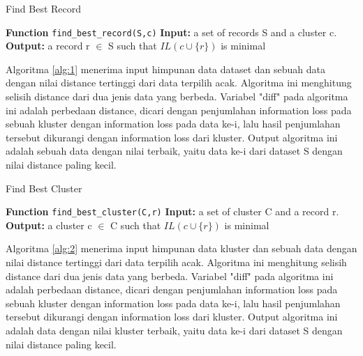 \begin{algorithm}[H]
  \caption{Find Best Record}\label{alg:1}
  \begin{algorithmic}[1]
  \State \textbf{Function} \texttt{find\_best\_record(S,c)}
  \State \textbf{Input:} a set of records S and a cluster c.
  \State \textbf{Output:} a record r $\in$ S such that $IL(c \cup \{r\})$ is minimal
  \\
  \EndIf
  \EndFor
  \end{algorithmic}
\end{algorithm}
Algoritma \ref{alg:1} menerima input himpunan data  dataset dan sebuah data dengan nilai distance tertinggi dari data terpilih acak. Algoritma ini menghitung selisih distance dari dua jenis data yang berbeda. Variabel "diff" pada algoritma ini adalah perbedaan distance, dicari dengan penjumlahan information loss pada sebuah kluster dengan information loss pada data ke-i, lalu hasil penjumlahan tersebut dikurangi dengan information loss dari kluster. Output algoritma ini adalah sebuah data dengan nilai terbaik, yaitu data ke-i dari dataset S dengan nilai distance paling kecil.
\begin{algorithm}[H]
  \caption{Find Best Cluster}\label{alg:2}
  \begin{algorithmic}[1]
  \State \textbf{Function} \texttt{find\_best\_cluster(C,r)}
  \State \textbf{Input:} a set of cluster C and a record r.
  \State \textbf{Output:} a cluster c $\in$ C such that $IL(c \cup \{r\})$ is minimal
  \\
  \EndIf
  \EndFor
  \end{algorithmic}
\end{algorithm}

Algoritma \ref{alg:2} menerima input himpunan data  kluster dan sebuah data dengan nilai distance tertinggi dari data terpilih acak. Algoritma ini menghitung selisih distance dari dua jenis data yang berbeda. Variabel "diff" pada algoritma ini adalah perbedaan distance, dicari dengan penjumlahan information loss pada sebuah kluster dengan information loss pada data ke-i, lalu hasil penjumlahan tersebut dikurangi dengan information loss dari kluster. Output algoritma ini adalah data dengan nilai kluster terbaik, yaitu data ke-i dari dataset S dengan nilai distance paling kecil.

